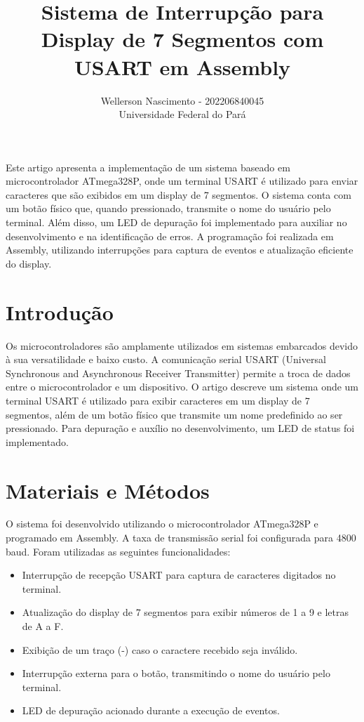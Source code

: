 \documentclass{sbrt}
\title{Sistema de Interrupção para Display de 7 Segmentos com USART em Assembly}
\author{%
  Wellerson Nascimento - 202206840045\\
  Universidade Federal do Pará
}
\begin{document}
\maketitle

\begin{resumo}
Este artigo apresenta a implementação de um sistema baseado em microcontrolador ATmega328P, onde um terminal USART é utilizado para enviar caracteres que são exibidos em um display de 7 segmentos. O sistema conta com um botão físico que, quando pressionado, transmite o nome do usuário pelo terminal. Além disso, um LED de depuração foi implementado para auxiliar no desenvolvimento e na identificação de erros. A programação foi realizada em Assembly, utilizando interrupções para captura de eventos e atualização eficiente do display.
\end{resumo}

\section{Introdução}
Os microcontroladores são amplamente utilizados em sistemas embarcados devido à sua versatilidade e baixo custo. A comunicação serial USART (Universal Synchronous and Asynchronous Receiver Transmitter) permite a troca de dados entre o microcontrolador e um dispositivo. O  artigo descreve um sistema onde um terminal USART é utilizado para exibir caracteres em um display de 7 segmentos, além de um botão físico que transmite um nome predefinido ao ser pressionado. Para depuração e auxílio no desenvolvimento, um LED de status foi implementado.

\section{Materiais e Métodos}
O sistema foi desenvolvido utilizando o microcontrolador ATmega328P e programado em Assembly. A taxa de transmissão serial foi configurada para 4800 baud. Foram utilizadas as seguintes funcionalidades:

\begin{itemize}
    \item Interrupção de recepção USART para captura de caracteres digitados no terminal.
    \item Atualização do display de 7 segmentos para exibir números de 1 a 9 e letras de A a F.
    \item Exibição de um traço (-) caso o caractere recebido seja inválido.
    \item Interrupção externa para o botão, transmitindo o nome do usuário pelo terminal.
    \item LED de depuração acionado durante a execução de eventos.
\end{itemize}
\end{document}
